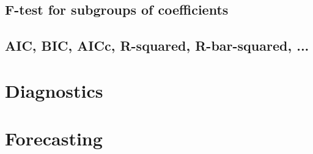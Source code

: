 \documentclass{article}
\begin{document}
\subsection{F-test for subgroups of coefficients}

\subsection{AIC, BIC, AICc, R-squared, R-bar-squared, ...} 


\section{Diagnostics}


\section{Forecasting}
\end{document}
